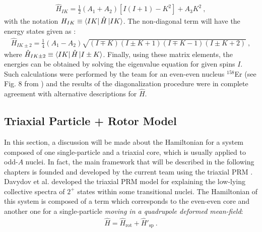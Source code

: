 \begin{align}
    \hat{H}_{IK}=\frac{1}{2}(A_1+A_2)\left[I(I+1)-K^2\right]+A_3K^2\ ,
\end{align}
with the notation $H_{IK}\equiv\bra{IK}\hat{H}\ket{IK}$. The non-diagonal term will have the energy states given as \cite{wen2015wobbling}:
\begin{align}
    \hat{H}_{IK\pm2}=\frac{1}{4}(A_1-A_2)\sqrt{(I\mp K)(I\pm K +1)(I \mp K -1)(I\pm K +2)}\ ,
\end{align}
where $\hat{H}_{IK\pm 2}\equiv \bra{IK}\hat{H}\ket{I\pm K}$. Finally, using these matrix elements, the energies can be obtained by solving the eigenvalue equation for given spins $I$. Such calculations were performed by the team for an even-even nucleus $^{158}$Er (see Fig. 8 from  \cite{raduta2017semiclassical}) and the results of the diagonalization procedure were in complete agreement with alternative descriptions for $\hat{H}$.

\subsection{Triaxial Particle + Rotor Model}
\label{tprm-model}

In this section, a discussion will be made about the Hamiltonian for a system composed of one single-particle and a triaxial core, which is usually applied to odd-$A$ nuclei. In fact, the main framework that will be described in the following chapters is founded and developed by the current team using the triaxial PRM \cite{davydov1958rotational}. Davydov et al. developed the triaxial PRM model for explaining the low-lying collective spectra of $2^+$ states within some transitional nuclei. The Hamiltonian of this system is composed of a term which corresponds to the even-even core and another one for a single-particle \emph{moving in a quadrupole deformed mean-field}:
\begin{align}
    \hat{H}=\hat{H}_\text{rot}+\hat{H}'_\text{sp}\ .
    \label{triaxial-prm-general-hamiltonian}
\end{align}

